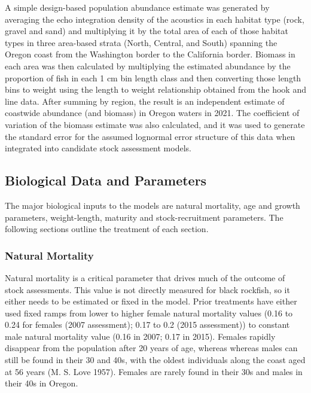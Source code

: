 \documentclass[11pt,
  english,
  letterpaper,
]{article}
\begin{document}
A simple design-based population abundance estimate was generated by averaging the echo integration density of the acoustics in each habitat type (rock, gravel and sand) and multiplying it by the total area of each of those habitat types in three area-based strata (North, Central, and South) spanning the Oregon coast from the Washington border to the California border. Biomass in each area was then calculated by multiplying the estimated abundance by the proportion of fish in each 1 cm bin length class and then converting those length bins to weight using the length to weight relationship obtained from the hook and line data. After summing by region, the result is an independent estimate of coastwide abundance (and biomass) in Oregon waters in 2021. The coefficient of variation of the biomass estimate was also calculated, and it was used to generate the standard error for the assumed lognormal error structure of this data when integrated into candidate stock assessment models.

\hypertarget{biological-data-and-parameters}{%
\subsection{Biological Data and Parameters}\label{biological-data-and-parameters}}

The major biological inputs to the models are natural mortality, age and growth parameters, weight-length, maturity and stock-recruitment parameters. The following sections outline the treatment of each section.

\hypertarget{natural-mortality}{%
\subsubsection{Natural Mortality}\label{natural-mortality}}

Natural mortality is a critical parameter that drives much of the outcome of stock assessments. This value is not directly measured for black rockfish, so it either needs to be estimated or fixed in the model. Prior treatments have either used fixed ramps from lower to higher female natural mortality values (0.16 to 0.24 for females (2007 assessment); 0.17 to 0.2 (2015 assessment)) to constant male natural mortality value (0.16 in 2007; 0.17 in 2015). Females rapidly disappear from the population after 20 years of age, whereas whereas males can still be found in their 30 and 40s, with the oldest individuals along the coast aged at 56 years (M. S. Love 1957). Females are rarely found in their 30s and males in their 40s in Oregon.
\end{document}
